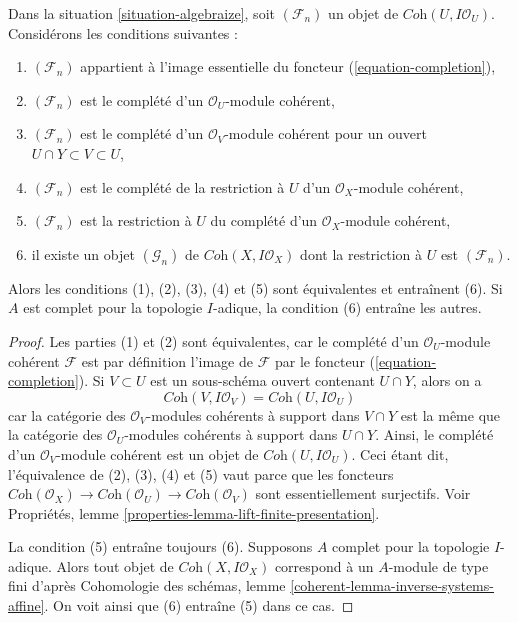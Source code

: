 \begin{lemma}
\label{lemma-essential-image-completion}
Dans la situation \ref{situation-algebraize}, soit $(\mathcal{F}_n)$
un objet de $\textit{Coh}(U, I\mathcal{O}_U)$. Considérons les
conditions suivantes :
\begin{enumerate}
\item $(\mathcal{F}_n)$ appartient à l'image essentielle
du foncteur (\ref{equation-completion}),
\item $(\mathcal{F}_n)$ est le complété d'un
$\mathcal{O}_U$-module cohérent,
\item $(\mathcal{F}_n)$ est le complété d'un
$\mathcal{O}_V$-module cohérent pour un ouvert $U \cap Y \subset V \subset U$,
\item $(\mathcal{F}_n)$ est le complété de
la restriction à $U$ d'un $\mathcal{O}_X$-module cohérent,
\item $(\mathcal{F}_n)$ est la restriction à $U$ du
complété d'un $\mathcal{O}_X$-module cohérent,
\item il existe un objet $(\mathcal{G}_n)$ de
$\textit{Coh}(X, I\mathcal{O}_X)$ dont la restriction
à $U$ est $(\mathcal{F}_n)$.
\end{enumerate}
Alors les conditions (1), (2), (3), (4) et (5) sont équivalentes et entraînent (6).
Si $A$ est complet pour la topologie $I$-adique, la condition (6) entraîne les autres.
\end{lemma}

\begin{proof}
Les parties (1) et (2) sont équivalentes, car le complété d'un
$\mathcal{O}_U$-module cohérent $\mathcal{F}$ est par définition l'image de
$\mathcal{F}$ par le foncteur (\ref{equation-completion}).
Si $V \subset U$ est un sous-schéma ouvert contenant $U \cap Y$, alors on a
$$
\textit{Coh}(V, I\mathcal{O}_V) =
\textit{Coh}(U, I\mathcal{O}_U)
$$
car la catégorie des $\mathcal{O}_V$-modules cohérents à support dans
$V \cap Y$ est la même que la catégorie des $\mathcal{O}_U$-modules cohérents
à support dans $U \cap Y$. Ainsi, le complété d'un
$\mathcal{O}_V$-module cohérent est un objet de $\textit{Coh}(U, I\mathcal{O}_U)$.
Ceci étant dit, l'équivalence de (2), (3), (4) et (5)
vaut parce que les foncteurs
$\textit{Coh}(\mathcal{O}_X) \to \textit{Coh}(\mathcal{O}_U) \to
\textit{Coh}(\mathcal{O}_V)$ sont essentiellement surjectifs.
Voir Propriétés, lemme \ref{properties-lemma-lift-finite-presentation}.

\medskip\noindent
La condition (5) entraîne toujours (6). Supposons $A$ complet pour la topologie $I$-adique.
Alors tout objet de $\textit{Coh}(X, I\mathcal{O}_X)$ correspond à un
$A$-module de type fini d'après Cohomologie des schémas, lemme
\ref{coherent-lemma-inverse-systems-affine}.
On voit ainsi que (6) entraîne (5) dans ce cas.
\end{proof}

